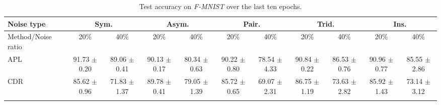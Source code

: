 \documentclass[11pt]{article}
\begin{document}
\begin{table}[!t]
    \small
\centering
	\begin{tabular}{l |cc|cc|cc|cc|cc} 
		\Xhline{3\arrayrulewidth}	 	
		   Noise type &\multicolumn{2}{c|}{Sym.}&\multicolumn{2}{c|}{Asym.}&\multicolumn{2}{c|}{Pair.}&\multicolumn{2}{c|}{Trid.}&\multicolumn{2}{c}{Ins.}\\
			\hline
		   Method/Noise ratio&  20\% & 40\%& 20\% & 40\% &20\% & 40\%& 20\% & 40\% & 20\% & 40\%\\
			\hline
			APL& \makecell{91.73\\ $\pm$\scriptsize{0.20}} 
			& \makecell{89.06\\ $\pm$\scriptsize{0.41}}
			& \makecell{90.13\\ $\pm$\scriptsize{0.17}}
			& \makecell{80.34\\ $\pm$\scriptsize{0.63}}
			& \makecell{90.22\\ $\pm$\scriptsize{0.80}}
			& \makecell{78.54\\ $\pm$\scriptsize{4.33}}
			& \makecell{90.84\\ $\pm$\scriptsize{0.22}}
			& \makecell{86.53\\ $\pm$\scriptsize{0.76}}
			& \makecell{90.96\\ $\pm$\scriptsize{0.77}}
			& \makecell{85.55\\ $\pm$\scriptsize{2.86}}\\\hline
			CDR & \makecell{85.62\\ $\pm$\scriptsize{0.96}}
			& \makecell{71.83\\ $\pm$\scriptsize{1.37}}
			& \makecell{89.78\\ $\pm$\scriptsize{0.41}}
			& \makecell{79.05\\ $\pm$\scriptsize{1.39}}
			& \makecell{85.72\\ $\pm$\scriptsize{0.65}}
			& \makecell{69.07\\ $\pm$\scriptsize{2.31}}
			& \makecell{86.75\\ $\pm$\scriptsize{1.19}}
			& \makecell{73.63\\ $\pm$\scriptsize{2.82}}
			& \makecell{85.92\\ $\pm$\scriptsize{1.43}}
			& \makecell{73.14\\ $\pm$\scriptsize{3.12}}\\
			\hline
		\Xhline{3\arrayrulewidth}
\end{tabular}
\caption
		{
Test accuracy on \textit{F-MNIST} over the last ten epochs. 
		}
	\label{tab:com_fmnist}
\end{table}		
\end{document}
